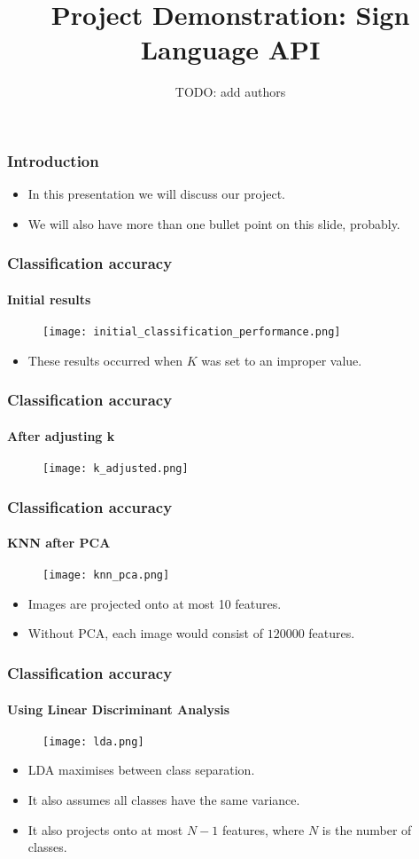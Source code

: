 \documentclass{beamer}
\title{Project Demonstration: Sign Language API}
\author{TODO: add authors}
\date{}
\begin{document}
\begin{frame}[t]
	\titlepage
\end{frame}

\begin{frame}[t]
	\frametitle{Introduction}
	\begin{itemize}
		\item In this presentation we will discuss our project.
		\item We will also have more than one bullet point on this slide, probably.
	\end{itemize}
\end{frame}

\begin{frame}[t]
	\frametitle{Classification accuracy}
	\framesubtitle{Initial results}
	\begin{figure}
		\texttt{[image: initial\_classification\_performance.png]}
	\end{figure}
	\begin{itemize}
		\item These results occurred when $K$ was set to an improper value.
	\end{itemize}
\end{frame}

\begin{frame}[t]
	\frametitle{Classification accuracy}
	\framesubtitle{After adjusting k}
	\begin{figure}
		\texttt{[image: k\_adjusted.png]}
	\end{figure}
\end{frame}

\begin{frame}[t]
	\frametitle{Classification accuracy}
	\framesubtitle{KNN after PCA}
	\begin{figure}
		\texttt{[image: knn\_pca.png]}
	\end{figure}
	\begin{itemize}
		\item Images are projected onto at most 10 features.
		\item Without PCA, each image would consist of $120000$ features.
	\end{itemize}
\end{frame}

\begin{frame}[t]
	\frametitle{Classification accuracy}
	\framesubtitle{Using Linear Discriminant Analysis}
	\begin{figure}
		\texttt{[image: lda.png]}
	\end{figure}
	\begin{itemize}
		\item LDA maximises between class separation.
		\item It also assumes all classes have the same variance.
		\item It also projects onto at most $N-1$ features,
			where $N$ is the number of classes.
	\end{itemize}
\end{frame}
\end{document}
